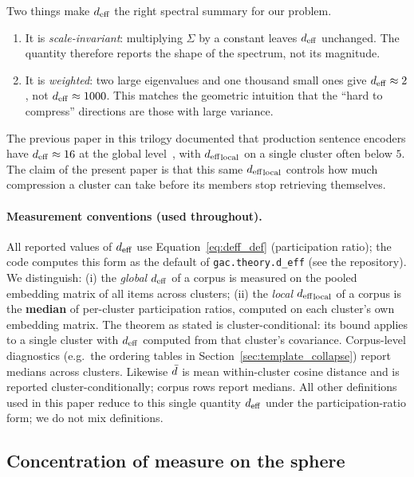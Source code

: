 Two things make ${d_{\mathrm{eff}}}$ the right spectral summary for our problem.
\begin{enumerate}[leftmargin=1.8em, itemsep=2pt]
\item It is \emph{scale-invariant}: multiplying $\Sigma$ by a constant
leaves ${d_{\mathrm{eff}}}$ unchanged. The quantity therefore reports the shape of
the spectrum, not its magnitude.
\item It is \emph{weighted}: two large eigenvalues and one thousand
small ones give ${d_{\mathrm{eff}}} \approx 2$, not ${d_{\mathrm{eff}}} \approx 1000$. This
matches the geometric intuition that the ``hard to compress''
directions are those with large variance.
\end{enumerate}

The previous paper in this trilogy documented that production sentence
encoders have ${d_{\mathrm{eff}}} \approx 16$ at the global
level~\cite{geometryOfForgetting2026}, with ${d_{\mathrm{eff}}}_{\mathrm{local}}$ on a
single cluster often below $5$. The claim of the present paper is that
this same ${d_{\mathrm{eff}}}_{\mathrm{local}}$ controls how much compression a
cluster can take before its members stop retrieving themselves.

\paragraph{Measurement conventions (used throughout).}
All reported values of ${d_{\mathrm{eff}}}$ use Equation~\eqref{eq:deff_def}
(participation ratio); the code computes this form as the default of
\texttt{gac.theory.d\_eff} (see the repository). We distinguish:
(i) the \emph{global} ${d_{\mathrm{eff}}}$ of a corpus is measured on the pooled
embedding matrix of all items across clusters;
(ii) the \emph{local} ${d_{\mathrm{eff}}}_{\mathrm{local}}$ of a corpus is the
\textbf{median} of per-cluster participation ratios, computed on each
cluster's own embedding matrix.
The theorem as stated is cluster-conditional: its bound applies to a
single cluster with ${d_{\mathrm{eff}}}$ computed from that cluster's covariance.
Corpus-level diagnostics (e.g.\ the ordering tables in
Section~\ref{sec:template_collapse}) report medians across clusters.
Likewise $\bar{d}$ is mean within-cluster cosine distance and is reported
cluster-conditionally; corpus rows report medians. All other
definitions used in this paper reduce to this single quantity ${d_{\mathrm{eff}}}$
under the participation-ratio form; we do not mix definitions.

\subsection{Concentration of measure on the sphere}
\label{sec:background:concentration}

